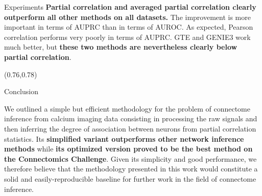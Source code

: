 \documentclass[final]{beamer}
\begin{document}
\begin{frame}{}
\begin{textblock}{0.74}
\begin{block}{Experiments \phantom{p}}
\textbf{Partial correlation and averaged partial correlation clearly outperform all other methods on all datasets.} The
improvement is more important in terms of AUPRC than in terms of AUROC. As
expected, Pearson correlation performs very poorly in terms of AUPRC. GTE and
GENIE3 work much better, but \textbf{these two methods are nevertheless clearly below
partial correlation}.

\end{block}

\end{textblock}




\begin{textblock}{0.22}(0.76,0.78)

\begin{block}{Conclusion \phantom{p}}
\vspace{-0.4cm}
\begin{center}

\begin{minipage}{0.95\linewidth}
\begin{shaded}

We outlined a simple but efficient methodology for the problem
of connectome inference from calcium imaging data consisting in processing the raw signals and then inferring the degree of association between neurons from partial correlation statistics. 
Its \textbf{simplified variant outperforms other
network inference methods} while \textbf{its optimized version proved to be the best method
on the Connectomics Challenge}.
Given its simplicity and good performance, we
therefore believe that the methodology presented in this work
would constitute a solid and easily-reproducible baseline for further work in
the field of connectome inference.



\end{shaded}
\end{minipage}
\end{center}


\end{block}
\end{textblock}
\end{frame}
\end{document}
